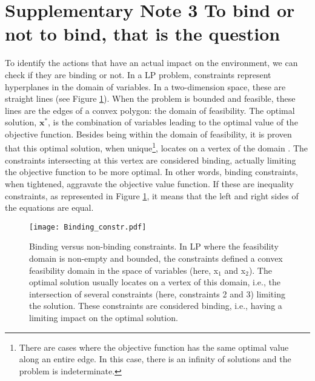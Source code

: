 \documentclass[12pt,letterpaper]{article}
\def\ie{i.e., }
\begin{document}
\section*{Supplementary Note 3 \hspace{2 mm} To bind or not to bind, that is the question}
\label{sec:binding}
To identify the actions that have an actual impact on the environment, we can check if they are binding or not. In a \gls*{LP} problem, constraints represent hyperplanes in the domain of variables. In a two-dimension space, these are straight lines (see Figure \ref{fig:Binding_constr}). When the problem is bounded and feasible, these lines are the edges of a convex polygon: the domain of feasibility. The optimal solution, $\textbf{x}^*$, is the combination of variables leading to the optimal value of the objective function. Besides being within the domain of feasibility, it is proven that this optimal solution, when unique\footnote{There are cases where the objective function has the same optimal value along an entire edge. In this case, there is an infinity of solutions and the problem is indeterminate.}, locates on a vertex of the domain \cite{bertsimas1997introduction}. The constraints intersecting at this vertex are considered binding, actually limiting the objective function to be more optimal. In other words, binding constraints, when tightened, aggravate the objective value function. If these are inequality constraints, as represented in Figure \ref{fig:Binding_constr}, it means that the left and right sides of the equations are equal.

\begin{figure}[!t]
\centering
\texttt{[image: Binding\_constr.pdf]}
\caption{Binding versus non-binding constraints. In \gls*{LP} where the feasibility domain is non-empty and bounded, the constraints defined a convex feasibility domain in the space of variables (here, x$_1$ and x$_2$). The optimal solution usually locates on a vertex of this domain, \ie the intersection of several constraints (here, constraints 2 and 3) limiting the solution. These constraints are considered binding, \ie having a limiting impact on the optimal solution.}
\label{fig:Binding_constr}
\end{figure}



\bigskip

\end{document}
